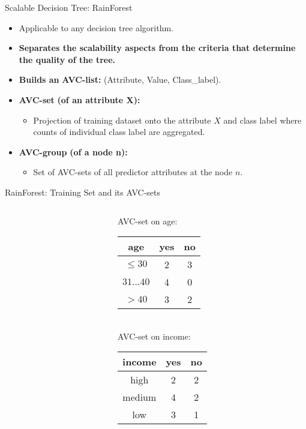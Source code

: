 \begin{frame}{Scalable Decision Tree: RainForest}
	\begin{itemize}
		\item Applicable to any decision tree algorithm.
		\item \textbf{Separates the scalability aspects from the criteria that determine the quality of the tree.}
		\item \textbf{Builds an} \textbf{\color{airforceblue}AVC-list:} (Attribute, Value, Class\_label).
		\item \textbf{\color{airforceblue}AVC-set} \textbf{(of an attribute X):}
		      \begin{itemize}
			      \item Projection of training dataset onto the attribute $X$ and class label where counts of individual class label are aggregated.
		      \end{itemize}
		\item \textbf{\color{airforceblue}AVC-group} \textbf{(of a node n):}
		      \begin{itemize}
			      \item Set of AVC-sets of all predictor attributes at the node $n$.
		      \end{itemize}
	\end{itemize}
\end{frame}

\begin{frame}{RainForest: Training Set and its AVC-sets}
	\begin{columns}
		\begin{column}{0.6\textwidth}
			\small
			
		\end{column}
		\begin{column}{0.3\textwidth}
			\vspace{-3cm}

			\centering
			AVC-set on age:\\
			\begin{tabular}{|c|c|c|}
				\hline
				age          & yes & no \\\hline
				$\leq 30$    & 2   & 3  \\\hline
				$31\ldots40$ & 4   & 0  \\\hline
				$>40$        & 3   & 2  \\\hline
			\end{tabular}\\[1cm]
			AVC-set on income:\\
			\begin{tabular}{|c|c|c|}
				\hline
				income & yes & no \\\hline
				high   & 2   & 2  \\\hline
				medium & 4   & 2  \\\hline
				low    & 3   & 1  \\\hline
			\end{tabular}
		\end{column}
	\end{columns}
\end{frame}

